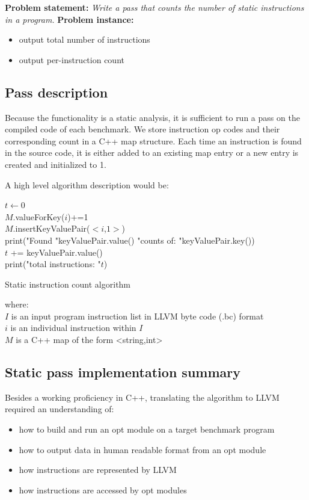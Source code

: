 
\textbf{Problem statement: }\textit{Write a pass that counts the number of static instructions in a program.}
\textbf{Problem instance:}
\begin{itemize}
\item output total number of instructions
\item output per-instruction count
\end{itemize}

\subsection{Pass description}

Because the functionality is a static analysis, it is sufficient to run a pass on the compiled code of each benchmark.
We store instruction op codes and their corresponding count in a C++ map structure. Each time an instruction is found in the source code, it is either added to an existing map entry or a new entry is created and initialized to 1.

A high level algorithm description would be:\\

\begin{algorithm}
 $t \gets 0$\\
 { 
 	{
 		$M$.valueForKey($i$)+=1\\
 	}
 	\Else
 	{
 		$M$.insertKeyValuePair($<i$,$1>$)\\
 	}
 }
 {
 	print("Found "keyValuePair.value() "counts of: "keyValuePair.key())\\
 	$t$ += keyValuePair.value()\\
 }
 print("total instructions: "$t$)
 \caption{Static instruction count algorithm}
\end{algorithm}
where:\\
$I$ is an input program instruction list in LLVM byte code (.bc) format\\
$i$ is an individual instruction within $I$\\
$M$ is a C++ map of the form <string,int>

\subsection{Static pass implementation summary}
Besides a working proficiency in C++, translating the algorithm to LLVM required an understanding of:
\begin{itemize}
\item how to build and run an opt module on a target benchmark program
\item how to output data in human readable format from an opt module
\item how instructions are represented by LLVM
\item how instructions are accessed by opt modules
\end{itemize}


